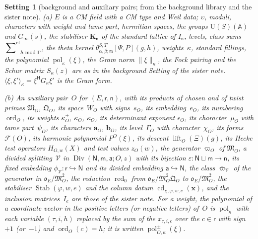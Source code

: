 \documentclass[11pt,a4paper]{article}
\newcommand{\m}[1]{\mbox{$#1$}}        %
\theoremstyle{plainx}
\theoremstyle{uprightx}
\newtheorem{setting}[theorem]{Setting}          %
\newcommand{\AAA}{\mathbb{A}}
\newcommand{\ix}[1]{\mathsf{#1}}
\newcommand{\OEr}{\mathfrak{o}_E}
\newcommand{\UU}{\mathrm{U}}
\newcommand{\KK}[1]{\mathbf{K}_{#1}}
\newcommand{\ip}[2]{\langle #1,#2\rangle}
\newcommand{\clsum}[2]{\sideset{}{^{\mathrm{cl}}}\sum_{#1\bmod #2}}
\newcommand{\tk}[7]{\theta^{#1,#2}_{#3,#4;#5}[#6,#7]}
\newcommand{\herm}{^{\mathsf{H}}}
\newcommand{\FormVx}[1]{\mathcal{F}(#1)}
\newcommand{\dsc}[1]{\operatorname{lift}_{#1}}
\begin{document}
\begin{setting}[background and auxiliary pairs; from the background library and the sister note]\label{set:bg}
\emph{(a)} $E$ is a CM field with a CM type and Weil data; $\upsilon$, moduli, characters with weight and tame
part, hermitian spaces, the groups \m{\UU(S)(\AAA)} and \m{G_\infty(s)}, the stabiliser \m{\KK{\ix n}} of the standard
lattice of \m{I_{\ix n}}, levels, class sums \m{\clsum{h}{\Gamma}}, the theta kernel
\m{\tk{S}{T}{\alpha}{\beta}{\mathfrak{m}}{\Psi}{P}(g,h)}, weights~$\kappa$, standard fillings, the polynomial
\m{\operatorname{pol}_\kappa(\xi)}, the Gram norm \m{\|\xi\|_\kappa}, the Fock pairing and the Schur matrix
\m{S_\kappa(z)} are as in the background Setting of the sister note. \m{\ip{\xi}{\xi'}_\kappa=\xi\herm G_\kappa\xi'} is the Gram form.

\emph{(b)} An auxiliary pair~$O$ for \m{(E,\ix r,\ix n)}, with its products of chosen and of twist primes
\m{\mathfrak{M}_O}, \m{\mathfrak{Q}_O}, its space~$W_O$ with signs~$s_O$, its embedding~$e_O$, its numbering
\m{\operatorname{ord}_O}, its weights \m{\kappa^{+}_O}, \m{\kappa^{-}_O}, \m{\kappa_O}, its determinant exponent
\m{\epsilon_O}, its character~$\mu_O$ with tame part~$\psi_O$, its characters \m{\mathbf{a}_O}, \m{\mathbf{b}_O}, its
level~$\Gamma_O$ with character~$\chi_O$, its forms \m{\FormVx{O}}, its harmonic polynomial \m{P^{O}(\xi)}, its descent
\m{\dsc{O}(\Xi)(g)}, its Hecke test operators \m{H_{O,w}(X)} and test values \m{z_O(w)}, the generator \m{\varpi_O} of
\m{\mathfrak{M}_O}, a divided splitting~$\mathcal{V}$ in \m{\operatorname{Div}(\ix N,\ix m,\ix a;O,z)} with its bijection
\m{\varepsilon\colon\ix N\sqcup\ix m\to\ix n}, its fixed embedding \m{\phi_{\mathcal{V}}\colon\ix r\hookrightarrow\ix N} and
its divided embedding \m{\ix a\hookrightarrow\ix N}, the class \m{\bar\varpi_{\mathcal{V}}} of the generator in
\m{\OEr/\mathfrak{M}_O^{2}}, the reduction \m{\operatorname{red}_0} from \m{\OEr/\mathfrak{M}_O^{2}\mathfrak{Q}_O} to
\m{\OEr/\mathfrak{M}_O^{2}}, the stabiliser \m{\operatorname{Stab}(\varphi,w,e)} and the column datum
\m{\operatorname{cd}_{\chi,\varphi,w,e}(\mathbf{x})}, and the inclusion matrices~$I_e$ are those of the sister note.
For a weight, the polynomial of a coordinate vector \emph{in the positive letters} (or \emph{negative letters}) of~$O$
is \m{\operatorname{pol}_\kappa} with each variable \m{(\tau,i,h)} replaced by the sum of the \m{x_{\tau,i,c}} over the
\m{c\in\ix r} with sign $+1$ (or~$-1$) and \m{\operatorname{ord}_O(c)=h}; it is written
\m{\operatorname{pol}^{\pm}_{O,\kappa}(\xi)}.


\end{setting}
\end{document}
